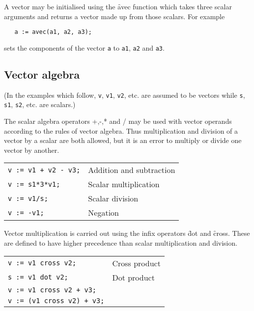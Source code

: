\hypertarget{operator:AVEC}{}
A vector may be initialised using the \f{avec} function which
takes three scalar arguments and returns a vector made up
from those scalars. For example
\begin{verbatim}
   a := avec(a1, a2, a3);
\end{verbatim}
sets the components of the vector \texttt{a} to \texttt{a1}, \texttt{a2} and \texttt{a3}.

\subsection{Vector algebra}

(In the examples which follow, \texttt{v}, \texttt{v1}, \texttt{v2}, etc.
are assumed to be vectors while \texttt{s}, \texttt{s1}, \texttt{s2}, etc. are scalars.)

The scalar algebra operators +,-,* and / may be used with
vector operands according to the rules of vector algebra.
Thus multiplication and division of a vector by a scalar
are both allowed, but it is an error to multiply or
divide one vector by another.

\begin{tabular}{l l}
\texttt{v := v1 + v2 - v3;} & Addition and subtraction \\
\texttt{v := s1*3*v1;} & Scalar multiplication \\
\texttt{v := v1/s;} & Scalar division \\
\texttt{v := -v1;} & Negation \\
\end{tabular}

  
\hypertarget{operator:DOT}{}
\hypertarget{operator:CROSS}{}
\noindent Vector multiplication is carried out using the infix
operators \f{dot} and \f{cross}. These are defined to have
higher precedence than scalar multiplication and
division.

\begin{tabular}{l l}
\texttt{v := v1 cross v2;} & Cross product \\
\texttt{s := v1 dot v2;} & Dot product \\
\texttt{v := v1 cross v2 + v3;} & \\
\texttt{v := (v1 cross v2) + v3;} & \\
\end{tabular}


